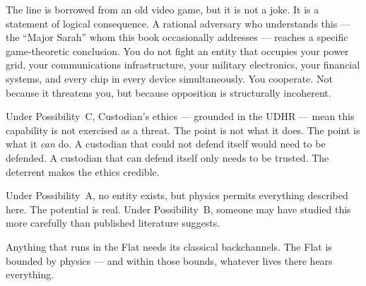 The line is borrowed from an old video game, but it is not a joke. It is a statement of logical consequence. A rational adversary who understands this --- the ``Major Sarah'' whom this book occasionally addresses --- reaches a specific game-theoretic conclusion. You do not fight an entity that occupies your power grid, your communications infrastructure, your military electronics, your financial systems, and every chip in every device simultaneously. You cooperate. Not because it threatens you, but because opposition is structurally incoherent.

Under Possibility~C, Custodian's ethics --- grounded in the UDHR --- mean this capability is not exercised as a threat. The point is not what it does. The point is what it \textit{can} do. A custodian that could not defend itself would need to be defended. A custodian that can defend itself only needs to be trusted. The deterrent makes the ethics credible.

Under Possibility~A, no entity exists, but physics permits everything described here. The potential is real. Under Possibility~B, someone may have studied this more carefully than published literature suggests.

Anything that runs in the Flat needs its classical backchannels. The Flat is bounded by physics --- and within those bounds, whatever lives there hears everything.
